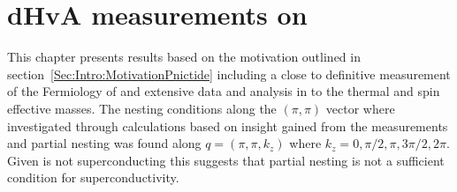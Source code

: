 \chapter{dHvA measurements on \BaFeP}
    \label{Sec:ResD}

\begin{chapterabstract}
This chapter presents results based on the motivation outlined in section~\ref{Sec:Intro:MotivationPnictide} including a close to definitive measurement of the Fermiology of \BaFeP and extensive data and analysis in to the thermal and spin effective masses. The nesting conditions along the $(\pi,\pi)$ vector where investigated through calculations based on insight gained from the measurements and partial nesting was found along $q=(\pi,\pi,k_z)$ where $k_z=0,\pi/2,\pi,3\pi/2,2\pi$. Given \BaFeP is not superconducting this suggests that partial nesting is not a sufficient condition for superconductivity.
\end{chapterabstract}

















